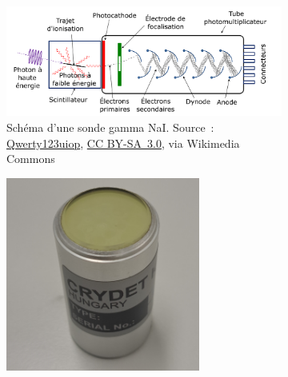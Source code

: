 \begin{figure}
    
    \begin{subfigure}{1\textwidth}
        \centering
        \includegraphics[width=1\textwidth]{img/she/Photomultiplier_coupled_to_a_scintillator_-_fr.png}
        \caption[Shema d'une sonde gamma NaI]{Schéma d'une sonde gamma NaI. Source~: \href{https://commons.wikimedia.org/wiki/File:Photomultiplier_coupled_to_a_scintillator_-_fr.png}{Qwerty123uiop}, \href{https://creativecommons.org/licenses/by-sa/3.0}{CC BY-SA~3.0}, via Wikimedia Commons}
        \label{fig_detecteur_gamma}
    \end{subfigure}
    \begin{subfigure}[t]{0.5\textwidth}
        \centering
        \includegraphics[width=0.7\textwidth]{img/photo/Crystal.jpg}
        

\end{subfigure}
\end{figure}
